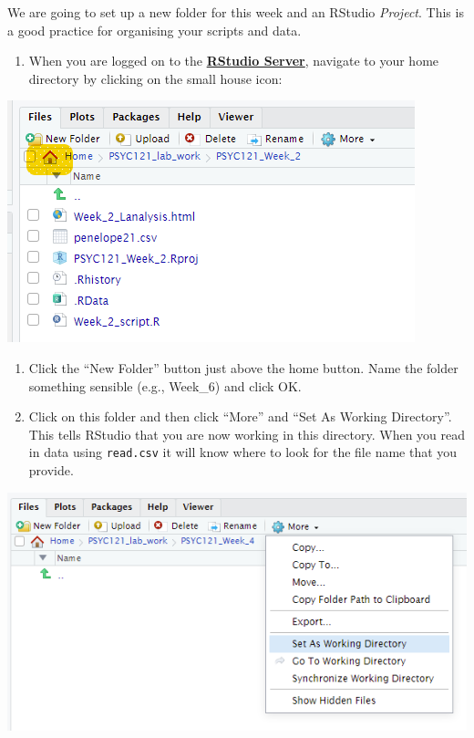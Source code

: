 \documentclass[
]{book}
\providecommand{\tightlist}{%
  \setlength{\itemsep}{0pt}\setlength{\parskip}{0pt}}
\begin{document}
We are going to set up a new folder for this week and an RStudio \emph{Project}. This is a good practice for organising your scripts and data.

\begin{enumerate}
\def\labelenumi{\arabic{enumi}.}
\tightlist
\item
  When you are logged on to the \href{http://psy-rstudio.lancaster.ac.uk}{\textbf{RStudio Server}}, navigate to your home directory by clicking on the small house icon:
\end{enumerate}

\includegraphics{files/Week_6/home_button.png}

\begin{enumerate}
\def\labelenumi{\arabic{enumi}.}
\setcounter{enumi}{1}
\item
  Click the ``New Folder'' button just above the home button. Name the folder something sensible (e.g., Week\_6) and click OK.
\item
  Click on this folder and then click ``More'' and ``Set As Working Directory''. This tells RStudio that you are now working in this directory. When you read in data using \texttt{read.csv} it will know where to look for the file name that you provide.
\end{enumerate}

\includegraphics{files/Week_6/working_dir.png}
\end{document}
